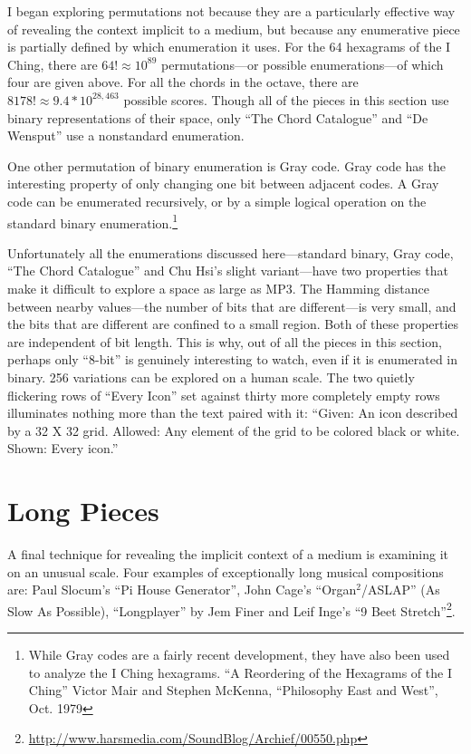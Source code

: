 \documentclass{thesis}
\begin{document}
I began exploring permutations not because they are a particularly effective way of revealing the context implicit to a medium, but because any enumerative piece is partially defined by which enumeration it uses. For the 64 hexagrams of the I Ching, there are $64!\approx10^{89}$ permutations---or possible enumerations---of which four are given above. For all the chords in the octave, there are $8178!\approx9.4*10^{28,463}$ possible scores. Though all of the pieces in this section use binary representations of their space, only ``The Chord Catalogue'' and ``De Wensput'' use a nonstandard enumeration.

One other permutation of binary enumeration is Gray code. Gray code has the interesting property of only changing one bit between adjacent codes. A Gray code can be enumerated recursively, or by a simple logical operation on the standard binary enumeration.\footnote{While Gray codes are a fairly recent development, they have also been used to analyze the I Ching hexagrams. ``A Reordering of the Hexagrams of the I Ching'' Victor Mair and Stephen McKenna, ``Philosophy East and West'', Oct. 1979}

Unfortunately all the enumerations discussed here---standard binary, Gray code, ``The Chord Catalogue'' and Chu Hsi's slight variant---have two properties that make it difficult to explore a space as large as MP3. The Hamming distance between nearby values---the number of bits that are different---is very small, and the bits that are different are confined to a small region. Both of these properties are independent of bit length. This is why, out of all the pieces in this section, perhaps only ``8-bit'' is genuinely interesting to watch, even if it is enumerated in binary. 256 variations can be explored on a human scale. The two quietly flickering rows of ``Every Icon'' set against thirty more completely empty rows illuminates nothing more than the text paired with it: ``Given: An icon described by a 32 X 32 grid. Allowed: Any element of the grid to be colored black or white. Shown: Every icon.''
		
\section{Long Pieces}

A final technique for revealing the implicit context of a medium is examining it on an unusual scale. Four examples of exceptionally long musical compositions are: Paul Slocum's ``Pi House Generator''\cite{paul_slocum_pi_2007}, John Cage's ``Organ$^2$/ASLAP'' (As Slow As Possible)\cite{john_cage_as_????}, ``Longplayer'' by Jem Finer\cite{jem_finer_longplayer_????} and Leif Inge's ``9 Beet Stretch''\footnote{\url{http://www.harsmedia.com/SoundBlog/Archief/00550.php}}.
\end{document}
